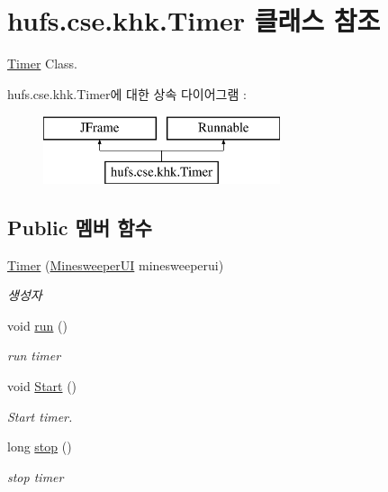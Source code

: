 \hypertarget{classhufs_1_1cse_1_1khk_1_1_timer}{}\section{hufs.\+cse.\+khk.\+Timer 클래스 참조}
\label{classhufs_1_1cse_1_1khk_1_1_timer}


\hyperlink{classhufs_1_1cse_1_1khk_1_1_timer}{Timer} Class.  


hufs.\+cse.\+khk.\+Timer에 대한 상속 다이어그램 \+: \begin{figure}[H]
\begin{center}
\leavevmode
\includegraphics[height=2.000000cm]{classhufs_1_1cse_1_1khk_1_1_timer}
\end{center}
\end{figure}
\subsection*{Public 멤버 함수}
\begin{DoxyCompactItemize}
\item 
\hyperlink{classhufs_1_1cse_1_1khk_1_1_timer_a25d73bcedd05f48488a8207778c0473f}{Timer} (\hyperlink{classhufs_1_1cse_1_1khk_1_1_minesweeper_u_i}{Minesweeper\+UI} minesweeperui)
\begin{DoxyCompactList}\small\item\em 생성자 \end{DoxyCompactList}\item 
void \hyperlink{classhufs_1_1cse_1_1khk_1_1_timer_a9d5cbcd099fbf45ee12465c31aa8a900}{run} ()
\begin{DoxyCompactList}\small\item\em run timer \end{DoxyCompactList}\item 
void \hyperlink{classhufs_1_1cse_1_1khk_1_1_timer_aa688344595bf7a0776ea1907715ca592}{Start} ()
\begin{DoxyCompactList}\small\item\em Start timer. \end{DoxyCompactList}\item 
long \hyperlink{classhufs_1_1cse_1_1khk_1_1_timer_a5ab9e7bd1e1b1f74604887cd99b27972}{stop} ()
\begin{DoxyCompactList}\small\item\em stop timer \end{DoxyCompactList}\end{DoxyCompactItemize}
